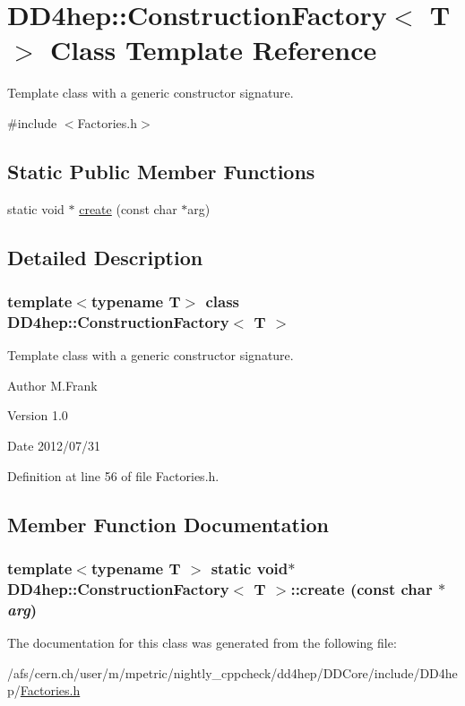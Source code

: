 \hypertarget{class_d_d4hep_1_1_construction_factory}{
\section{DD4hep::ConstructionFactory$<$ T $>$ Class Template Reference}
\label{class_d_d4hep_1_1_construction_factory}
}


Template class with a generic constructor signature.  


{\ttfamily \#include $<$Factories.h$>$}\subsection*{Static Public Member Functions}
\begin{DoxyCompactItemize}
\item 
static void $\ast$ \hyperlink{class_d_d4hep_1_1_construction_factory_adfdfbf52f13ce3d263b10623a3ce32ae}{create} (const char $\ast$arg)
\end{DoxyCompactItemize}


\subsection{Detailed Description}
\subsubsection*{template$<$typename T$>$ class DD4hep::ConstructionFactory$<$ T $>$}

Template class with a generic constructor signature. \begin{DoxyAuthor}{Author}
M.Frank 
\end{DoxyAuthor}
\begin{DoxyVersion}{Version}
1.0 
\end{DoxyVersion}
\begin{DoxyDate}{Date}
2012/07/31 
\end{DoxyDate}


Definition at line 56 of file Factories.h.

\subsection{Member Function Documentation}
\hypertarget{class_d_d4hep_1_1_construction_factory_adfdfbf52f13ce3d263b10623a3ce32ae}{
\subsubsection[{create}]{\setlength{\rightskip}{0pt plus 5cm}template$<$typename T $>$ static void$\ast$ {\bf DD4hep::ConstructionFactory}$<$ {\bf T} $>$::create (const char $\ast$ {\em arg})}}
\label{class_d_d4hep_1_1_construction_factory_adfdfbf52f13ce3d263b10623a3ce32ae}


The documentation for this class was generated from the following file:\begin{DoxyCompactItemize}
\item 
/afs/cern.ch/user/m/mpetric/nightly\_\-cppcheck/dd4hep/DDCore/include/DD4hep/\hyperlink{_d_d_core_2include_2_d_d4hep_2_factories_8h}{Factories.h}\end{DoxyCompactItemize}
